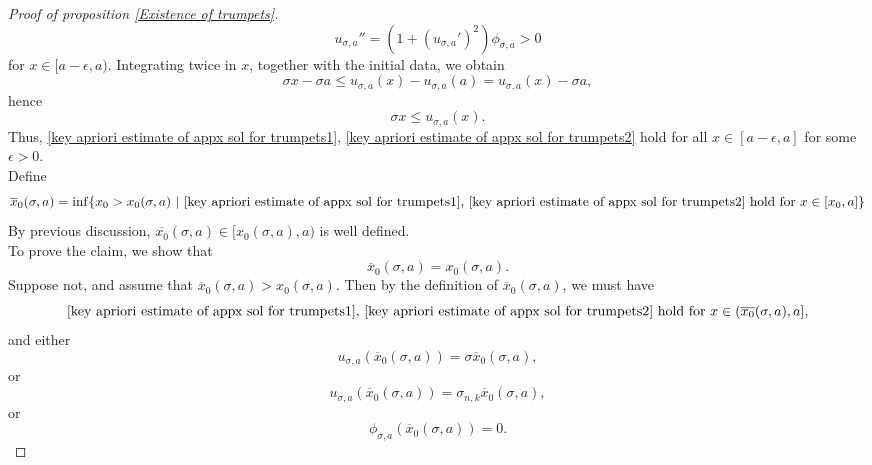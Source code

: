 \documentclass[pdflatex,sn-mathphys-num]{sn-jnl}
\begin{document}
\begin{proof}[Proof of proposition \ref{Existence of trumpets}]
\begin{equation}
        u_{\sigma, a}'' = (1 + (u_{\sigma, a}')^2)\phi_{\sigma, a} > 0
    \end{equation}
    for $x \in [a - \epsilon, a)$. Integrating twice in $x$, together with the initial data, we obtain \begin{equation}
        \sigma x - \sigma a\leq u_{\sigma, a}(x) - u_{\sigma, a}(a) = u_{\sigma, a}(x) - \sigma a,
    \end{equation} hence
    \begin{equation}
        \sigma x \leq u_{\sigma,a}(x).
    \end{equation}
   Thus, \eqref{key apriori estimate of appx sol for trumpets1}, \eqref{key apriori estimate of appx sol for trumpets2} hold for all $x \in [a - \epsilon, a]$ for some $\epsilon > 0$.\\

Define 
\begin{equation}\label{definition of x0bar}
        \overline{x}_0(\sigma, a) = \inf\{x_0 > x_0(\sigma, a) \ | \ \text{\eqref{key apriori estimate of appx sol for trumpets1}, \eqref{key apriori estimate of appx sol for trumpets2} hold for } x \in [x_0, a]\}
    \end{equation}
    By previous discussion, $\overline{x_0}(\sigma, a) \in [x_0(\sigma, a), a)$ is well defined.\\

    To prove the claim, we show that 
    \begin{equation}
        \overline{x}_0(\sigma, a) = x_0(\sigma, a).
    \end{equation}
    Suppose not, and assume that $\overline{x}_0(\sigma, a) > x_0(\sigma, a)$. Then by the definition of $\overline{x}_0(\sigma, a)$, we must have
    \begin{equation}\label{Property 1}
        \text{\eqref{key apriori estimate of appx sol for trumpets1}, \eqref{key apriori estimate of appx sol for trumpets2} hold for $x \in (\overline{x_0}(\sigma, a), a]$},
    \end{equation}
     and either
     \begin{equation}\label{possible 2-1}
         u_{\sigma, a}(\overline{x}_0(\sigma, a)) = \sigma \overline{x}_0(\sigma, a),
     \end{equation}
      or 
      \begin{equation}\label{possible 2-2}
        u_{\sigma, a}(\overline{x}_0(\sigma, a)) = \sigma_{n,k}\overline{x}_0(\sigma, a) , 
      \end{equation}
      or 
      \begin{equation}\label{possible 2-3}
         \phi_{\sigma, a}(\overline{x}_0(\sigma, a)) = 0. 
      \end{equation}
      

\end{proof}
\end{document}
